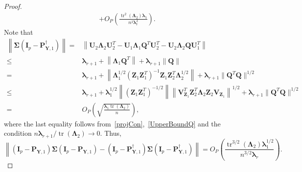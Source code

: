 \documentclass[12pt]{article} %
\DeclareMathOperator{\mytr}{tr}
\newcommand{\bQ}{\mathbf{Q}}
\newcommand{\bZ}{\mathbf{Z}}
\newcommand{\bP}{\mathbf{P}}
\newcommand{\bY}{\mathbf{Y}}
\newcommand{\bI}{\mathbf{I}}
\newcommand{\bU}{\mathbf{U}}
\newcommand{\bV}{\mathbf{V}}
\newcommand{\bfsym}[1]{\ensuremath{\boldsymbol{#1}}}
\def\blambda {\bfsym {\lambda}}
\def\bLambda {\bfsym {\Lambda}}
\def\bSigma {\bfsym {\Sigma}}
\theoremstyle{definition}
\begin{document}
\begin{appendices}
\begin{proof}
\begin{equation*}
\begin{split}
         +
         O_P\left(\frac{\mytr^2(\bLambda_2)\blambda_1}{n^2\blambda_r^2}\right)
         .
         \end{split}
         \end{equation*}
Note that
\begin{equation*}
    \begin{split}
         \left\|\bSigma 
         (\bI_p-\bP_{\bY,1}^{\dagger})\right\|
         =&
         \left\|
         \bU_2 \bLambda_2 \bU_2^T
         -\bU_1 \bLambda_1 \bQ^T \bU_2^T
         -\bU_2 \bLambda_2 \bQ \bU_1^T
         \right\|
         \\
         \leq &
         \blambda_{r+1}
         +
         \left\|
          \bLambda_1 \bQ^T
          \right\|
          +
          \blambda_{r+1}
          \left\|
          \bQ 
         \right\|
         \\
         = &
         \blambda_{r+1}
         +
         \left\|
         \bLambda_1^{1/2} (\bZ_1 \bZ_1^T)^{-1} \bZ_1 \bZ_2^T \bLambda_2^{1/2}
         \right\|
         +
         \blambda_{r+1}\|\bQ^T \bQ\|^{1/2}
         \\
         \leq &
         \blambda_{r+1}
         +
         \blambda_1^{1/2}
         \left\|
        (\bZ_1 \bZ_1^T)^{-1/2}
         \right\|
         \left\|
         \bV_{\bZ_1}^T \bZ_2^T \bLambda_2 \bZ_2 \bV_{\bZ_1}
         \right\|^{1/2}
         +
         \blambda_{r+1}\|\bQ^T \bQ\|^{1/2}
         \\
         =&
         O_P\left(\sqrt{\frac{\blambda_1\mytr(\bLambda_2)}{n}}\right),
    \end{split}
\end{equation*}
where the last equality follows from~\eqref{projCon},~\eqref{UpperBoundQ} and the condition $n\blambda_{r+1}/\mytr(\bLambda_2)\to 0$.
Thus,
\begin{equation}\label{choc1}
         \left\|
         (\bI_p-\bP_{\bY,1})
         \bSigma 
         (\bI_p-\bP_{\bY,1})
         -
         (\bI_p-\bP_{\bY,1}^{\dagger})
         \bSigma 
         (\bI_p-\bP_{\bY,1}^{\dagger})
         \right\|
         = 
         O_P\left(\frac{\mytr^{3/2}(\bLambda_2)\blambda_1^{1/2}}{n^{3/2}\blambda_r}\right)
         .
         \end{equation}


\end{proof}
\end{appendices}
\end{document}
